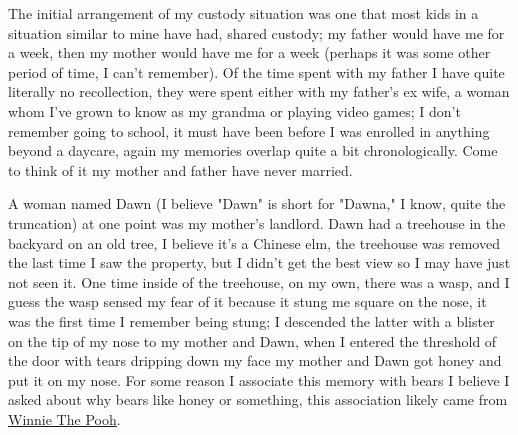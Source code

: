 \documentclass[12pt]{article}
\begin{document}
The initial arrangement of my custody situation was one that most kids in a
    situation similar to mine have had, shared custody; my father would have me
    for a week, then my mother would have me for a week (perhaps it was some
    other period of time, I can't remember).
Of the time spent with my father I have quite literally no recollection, they
    were spent either with my father's ex wife, a woman whom I've grown to know
    as my grandma or playing video games; I don't remember going to school, it
    must have been before I was enrolled in anything beyond a daycare, again my
    memories overlap quite a bit chronologically.
Come to think of it my mother and father have never married.

A woman named Dawn (I believe "Dawn" is short for "Dawna," I know, quite the
    truncation) at one point was my mother's landlord.
Dawn had a treehouse in the backyard on an old tree, I believe it's a Chinese
    elm, the treehouse was removed the last time I saw the property, but I 
    didn't get the best view so I may have just not seen it. 
One time inside of the treehouse, on my own, there was a wasp, and I guess the
    wasp sensed my fear of it because it stung me square on the nose, it was the
    first time I remember being stung; I descended the latter with a blister on
    the tip of my nose to my mother and Dawn, when I entered the threshold of
    the door with tears dripping down my face my mother and Dawn got honey and
    put it on my nose.
For some reason I associate this memory with bears I believe I asked about why
    bears like honey or something, this association likely came from 
    {\color{blue}\underline{\href{https://winniethepooh.disney.com/}{Winnie
    The Pooh}}}.
\end{document}
